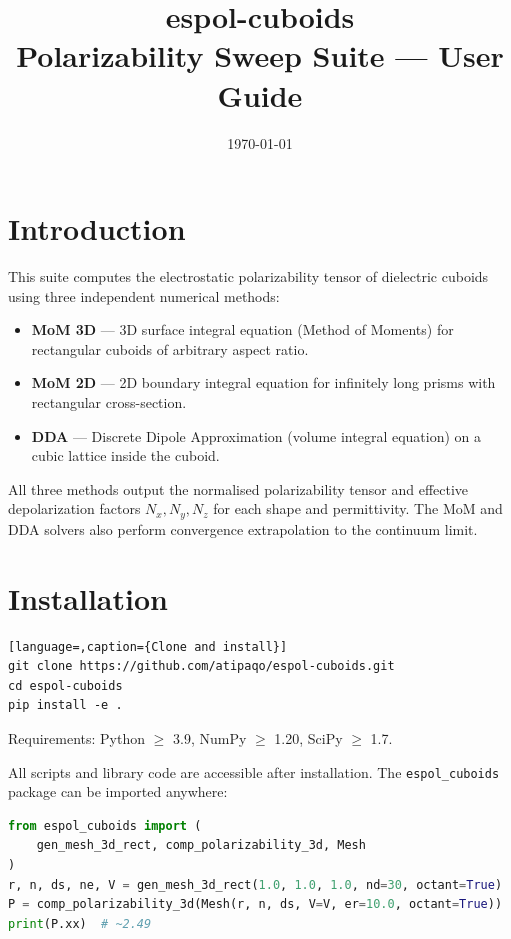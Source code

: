 \documentclass[a4paper,11pt]{article}
\title{espol-cuboids \\ Polarizability Sweep Suite --- User Guide}
\author{}
\date{\today}
\begin{document}
\maketitle
\tableofcontents
\newpage

\section{Introduction}

This suite computes the electrostatic polarizability tensor of dielectric
cuboids using three independent numerical methods:
%
\begin{itemize}
    \item \textbf{MoM 3D} — 3D surface integral equation (Method of Moments)
          for rectangular cuboids of arbitrary aspect ratio.
    \item \textbf{MoM 2D} — 2D boundary integral equation for infinitely long
          prisms with rectangular cross-section.
    \item \textbf{DDA} — Discrete Dipole Approximation (volume integral
          equation) on a cubic lattice inside the cuboid.
\end{itemize}
%
All three methods output the normalised polarizability tensor and effective
depolarization factors \(N_x, N_y, N_z\) for each shape and permittivity.
The MoM and DDA solvers also perform convergence extrapolation to the
continuum limit.

\section{Installation}

\begin{lstlisting}[language=,caption={Clone and install}]
git clone https://github.com/atipaqo/espol-cuboids.git
cd espol-cuboids
pip install -e .
\end{lstlisting}

Requirements: Python $\ge$ 3.9, NumPy $\ge$ 1.20, SciPy $\ge$ 1.7.

All scripts and library code are accessible after installation.  The
\texttt{espol\_cuboids} package can be imported anywhere:

\begin{lstlisting}[language=Python,caption={Library usage example}]
from espol_cuboids import (
    gen_mesh_3d_rect, comp_polarizability_3d, Mesh
)
r, n, ds, ne, V = gen_mesh_3d_rect(1.0, 1.0, 1.0, nd=30, octant=True)
P = comp_polarizability_3d(Mesh(r, n, ds, V=V, er=10.0, octant=True))
print(P.xx)  # ~2.49
\end{lstlisting}
\end{document}
